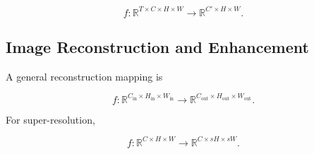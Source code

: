 \documentclass[11pt,a4paper]{article}
\begin{document}
\[
f:
\mathbb{R}^{T\times C\times H\times W}
\rightarrow
\mathbb{R}^{C'\times H\times W}.
\]

\subsection{Image Reconstruction and Enhancement}

A general reconstruction mapping is

\[
f:
\mathbb{R}^{C_{\mathrm{in}}\times H_{\mathrm{in}}\times W_{\mathrm{in}}}
\rightarrow
\mathbb{R}^{C_{\mathrm{out}}\times H_{\mathrm{out}}\times W_{\mathrm{out}}}.
\]

For super-resolution,

\[
f:
\mathbb{R}^{C\times H\times W}
\rightarrow
\mathbb{R}^{C\times sH\times sW}.
\]

\end{document}
